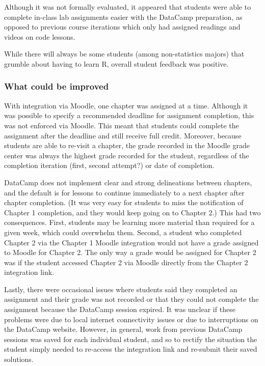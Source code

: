 \documentclass{tise_style_doi}
\begin{document}
Although it was not formally evaluated, it appeared that students were able to complete
in-class lab assignments easier with the DataCamp preparation, as opposed to previous
course iterations which only had assigned readings and videos on code lessons.

While there will always be some students (among non-statistics majors) that grumble about 
having to learn R, overall student feedback was positive.

\subsubsection{What could be improved}

With integration via Moodle, one chapter was assigned at a time.  Although it
was possible to specify a recommended deadline for assignment completion, this
was not enforced via Moodle.  This meant that students could complete the
assignment after the deadline and still receive full credit.  Moreover,
because students are able to re-visit a chapter, the grade recorded in the Moodle
grade center was always the highest grade recorded for the student, regardless of
the completion iteration (first, second attempt?) or date of completion.

DataCamp does not implement clear and strong delineations between chapters, and the
default is for lessons to continue immediately to a next chapter after chapter
completion.  (It was very easy for students to miss the notification of Chapter 1
completion, and they would keep going on to Chapter 2.)  This had two consequences.
First, students may be learning more material than required for a given week, which
could overwhelm them.  Second, a student who completed Chapter 2 via the Chapter 1 
Moodle integration would not have a grade assigned to Moodle for Chapter 2.  The only
way a grade would be assigned for Chapter 2 was if the student accessed Chapter 2 via 
Moodle directly from the Chapter 2 integration link.

Lastly, there were occasional issues where students said they completed an assignment
and their grade was not recorded or that they could not complete the assignment because
the DataCamp session expired.  It was unclear if these problems were due to local internet
connectivity issues or due to interruptions on the DataCamp website.  However, in general,
work from previous DataCamp sessions was saved for each individual student, and so to 
rectify the situation the student simply needed to re-access the integration link and 
re-submit their saved solutions.
\end{document}
